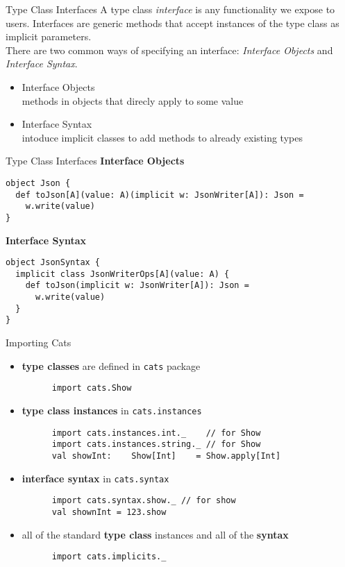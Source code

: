 \documentclass[aspectratio=169]{beamer}
\begin{document}
\begin{frame}{Type Class Interfaces}
A type class \textit{interface} is any functionality we expose to users. Interfaces are generic methods that
accept instances of the type class as implicit parameters. \\
There are two common ways of specifying an interface: \textit{Interface Objects} and \textit{Interface Syntax}.
\begin{itemize}
  \item Interface Objects
    \\methods in objects that direcly apply to some value
  \item Interface Syntax
    \\intoduce implicit classes to add methods to already existing types
\end{itemize}
\end{frame}

\begin{frame}[fragile]{Type Class Interfaces}
\textbf{Interface Objects}
\begin{verbatim}
object Json {
  def toJson[A](value: A)(implicit w: JsonWriter[A]): Json =
    w.write(value)
}
\end{verbatim}
\textbf{Interface Syntax}
\begin{verbatim}
object JsonSyntax {
  implicit class JsonWriterOps[A](value: A) {
    def toJson(implicit w: JsonWriter[A]): Json =
      w.write(value)
  }
}
\end{verbatim}
\end{frame}

\begin{frame}[fragile]{Importing Cats}
  \begin{itemize}
    \item \textbf{type classes} are defined in \texttt{cats} package \\
      \begin{verbatim}
      import cats.Show
      \end{verbatim}
    \item \textbf{type class instances} in \texttt{cats.instances} \\
      \begin{verbatim}
      import cats.instances.int._    // for Show
      import cats.instances.string._ // for Show
      val showInt:    Show[Int]    = Show.apply[Int]
      \end{verbatim}
    \item \textbf{interface syntax} in \texttt{cats.syntax} \\
      \begin{verbatim}
      import cats.syntax.show._ // for show
      val shownInt = 123.show
      \end{verbatim}
    \item all of the standard \textbf{type class} instances and all of the \textbf{syntax}
      \begin{verbatim}
      import cats.implicits._
      \end{verbatim}
  \end{itemize}
\end{frame}
\end{document}
